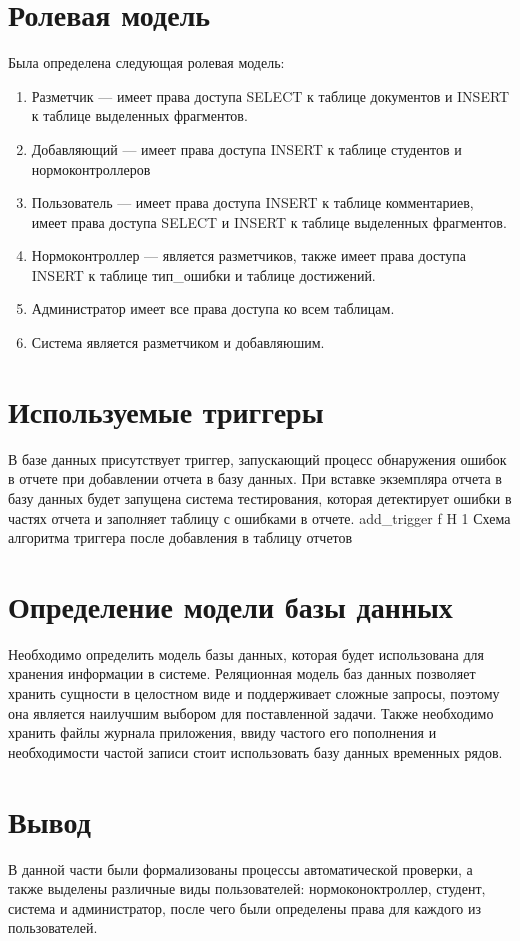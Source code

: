 \section{Ролевая модель}
Была определена следующая ролевая модель:
\begin{enumerate}
	\item Разметчик --- имеет права доступа SELECT к таблице документов и INSERT к таблице выделенных фрагментов.
	\item Добавляющий --- имеет права доступа INSERT к таблице студентов и нормоконтроллеров
	\item Пользователь --- имеет права доступа INSERT к таблице комментариев, имеет права доступа SELECT  и INSERT к таблице выделенных фрагментов.
	\item Нормоконтроллер --- является разметчиков, также имеет права доступа INSERT к таблице тип\_ошибки и таблице достижений.
	\item Администратор имеет все права доступа ко всем таблицам.
	\item Система является разметчиком и добавляюшим.
\end{enumerate}
\section{Используемые триггеры}
В базе данных присутствует триггер, запускающий процесс обнаружения ошибок в отчете при добавлении отчета в базу данных. При вставке экземпляра отчета в базу данных будет запущена система тестирования, которая детектирует ошибки в частях отчета и заполняет таблицу с ошибками в отчете. 
{add_trigger} %
{f} %
{H} %
{1\textwidth} %
{Схема алгоритма триггера после добавления в таблицу отчетов} %

\section{Определение модели базы данных}
Необходимо определить модель базы данных, которая будет использована для хранения информации в системе. Реляционная модель баз данных позволяет хранить сущности в целостном виде и поддерживает сложные запросы, поэтому она является наилучшим выбором для поставленной задачи. Также необходимо хранить файлы журнала приложения, ввиду частого его пополнения и необходимости частой записи стоит использовать базу данных временных рядов.

\section*{Вывод}
В данной части были формализованы процессы автоматической проверки, а также выделены различные виды пользователей: нормоконоктроллер, студент, система и администратор, после чего были определены права для каждого из пользователей.




